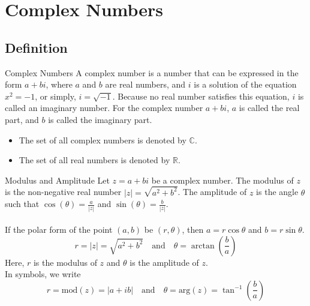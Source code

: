 
\section{Complex Numbers}
\subsection{Definition}

\begin{definition}{Complex Numbers}{}
    A complex number is a number that can be expressed in the form $a + bi$, where $a$ and $b$ are real numbers, and $i$ is a solution of the equation $x^2 = -1$, or simply, $i=\sqrt{-1}$. Because no real number satisfies this equation, $i$ is called an imaginary number. For the complex number $a + bi$, $a$ is called the real part, and $b$ is called the imaginary part. 
    \begin{itemize}
        \item The set of all complex numbers is denoted by $\mathbb{C}$.
        \item The set of all real numbers is denoted by $\mathbb{R}$.
    \end{itemize}
\end{definition}

\begin{definition}{Modulus and Amplitude}{}
    Let $z = a + bi$ be a complex number. The modulus of $z$ is the non-negative real number $|z| = \sqrt{a^2 + b^2}$. The amplitude of $z$ is the angle $\theta$ such that $\cos(\theta) = \frac{a}{|z|}$ and $\sin(\theta) = \frac{b}{|z|}$. \\~\\
    If the polar form of the point $(a,b)$ be $(r,\theta)$, then $a = r\cos\theta$ and $b = r\sin\theta$.
    \begin{equation}
        r = |z| = \sqrt{a^2 + b^2} \quad \text{and} \quad \theta = \arctan\left(\frac{b}{a}\right)
    \end{equation}
    Here, $r$ is the modulus of $z$ and $\theta$ is the amplitude of $z$. \\
    In symbols, we write
    \begin{equation}
        r = \text{mod} (z) = |a+ib| \quad \text{and} \quad \theta = \text{arg} (z) = \tan^{-1}\left(\frac{b}{a}\right)
    \end{equation}
\end{definition}


